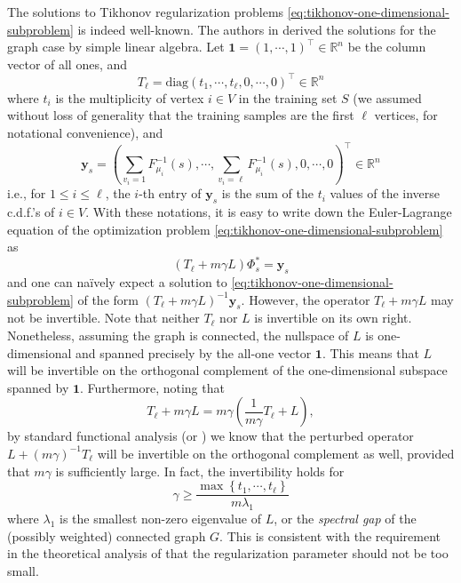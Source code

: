 \documentclass[letterpaper]{article} %
\begin{document}
The solutions to Tikhonov regularization problems \eqref{eq:tikhonov-one-dimensional-subproblem} is indeed well-known. The authors in \cite{Belkin2004} derived the solutions for the graph case by simple linear algebra. 
Let $\mathbf{1}=\left( 1,\cdots,1 \right)^{\top}\in\mathbb{R}^n$ be the column vector of all ones, and
$$T_\ell=\mathrm{diag}\left( t_1,\cdots,t_{\ell},0,\cdots,0 \right)^{\top}\in\mathbb{R}^n$$
where $t_i$ is the multiplicity of vertex $i\in V$ in the training set $S$ (we assumed without loss of generality that the training samples are the first $\ell$ vertices, for notational convenience), and
\begin{equation}
  \label{eq:y-defn}
  \mathbf{y}_s=\left( \sum_{v_{i}=1}F_{\mu_i}^{-1}\left( s \right),\cdots,\sum_{v_i=\ell}F_{\mu_i}^{-1}\left( s \right),0,\cdots,0 \right)^{\top}\in\mathbb{R}^n
\end{equation}
i.e., for $1\leq i\leq \ell$, the $i$-th entry of $\mathbf{y}_s$ is the sum of the $t_i$ values of the inverse c.d.f.'s of $i\in V$. With these notations, it is easy to write down the Euler-Lagrange equation of the optimization problem \eqref{eq:tikhonov-one-dimensional-subproblem} as
\begin{equation}
  \label{eq:tikhonov-one-dimensional-subproblem-euler-lagrange}
  \left( T_{\ell}+m\gamma L \right)\Phi_s^{*}=\mathbf{y}_s
\end{equation}
and one can na\"ively expect a solution to \eqref{eq:tikhonov-one-dimensional-subproblem} of the form $\left( T_{\ell}+m\gamma L \right)^{-1}\mathbf{y}_s$. However, the operator  $T_{\ell}+m\gamma L$ may not be invertible. Note that neither $T_{\ell}$ nor $L$ is invertible on its own right. Nonetheless, assuming the graph is connected, the nullspace of $L$ is one-dimensional and spanned precisely by the all-one vector $\mathbf{1}$. This means that $L$ will be invertible on the orthogonal complement of the one-dimensional subspace spanned by $\mathbf{1}$. Furthermore, noting that
\begin{equation}
  \label{eq:standard-functional-analysis}
  T_{\ell}+m\gamma L=m\gamma \left( \frac{1}{m\gamma}T_{\ell}+L \right),
\end{equation}
by standard functional analysis (or \cite[Proof of Theorem 5]{Belkin2004}) we know that the perturbed operator $L+\left( m\gamma \right)^{-1}T_{\ell}$ will be invertible on the orthogonal complement as well, provided that $m\gamma$ is sufficiently large. In fact, the invertibility holds for
\begin{equation*}
\gamma\geq \frac{\max \left\{ t_1,\cdots,t_{\ell} \right\}}{m\lambda_1}
\end{equation*}
where $\lambda_1$ is the smallest non-zero eigenvalue of $L$, or the \emph{spectral gap} of the (possibly weighted) connected graph $G$. This is consistent with the requirement in the theoretical analysis of \cite{Belkin2004} that the regularization parameter should not be too small.
\end{document}
